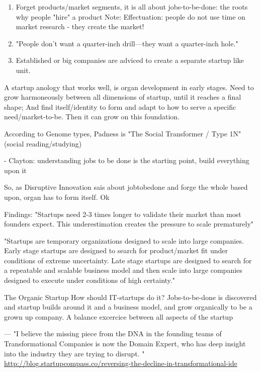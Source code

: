 \documentclass[a4paper,10pt]{book}
\begin{document}
\begin{enumerate}
 \item Forget products/market segments, it is all about jobs-to-be-done: the roots why people "hire" a product \cite{reinvetingBusinessModel}
       Note: Effectuation: people do not use time on market research - they create the market!
 \item "People don’t want a quarter-inch drill—they want a quarter-inch hole."
 \item Established or big companies are adviced to create a separate startup like unit.
\end{enumerate}

 
 
A startup anology that works well, is organ development in early stages. 
Need to grow harmoneously between all dimensions of startup, until it reaches a final shape;
And find itself/identity to form and adapt to how to serve a specific need/market-to-be.
Then it can grow on this foundation.

According to Genome types, Padness is "The Social Transformer / Type 1N" (social reading/studying)

 - Clayton: understanding jobs to be done is the starting point, build everything upon it \cite{reinvetingBusinessModel}

So, as Disruptive Innovation sais about jobtobedone and forge the whole based upon, organ has to form itself. Ok

Findings:
"Startups need 2-3 times longer to validate their market than most founders
expect. This underestimation creates the pressure to scale prematurely"

"Startups are temporary organizations designed to scale into large companies.
Early stage startups are designed to search for product/market fit under
conditions of extreme uncertainty. Late stage startups are designed to search for
a repeatable and scalable business model and then scale into large companies
designed to execute under conditions of high certainty."

The Organic Startup
 How should IT-startups do it? Jobs-to-be-done is discovered and startup builds around it and a business model, and grow organically
 to be a grown up company.
 A balance excercice between all aspects of the startup
 
 
 ---
 "I believe the missing piece from the DNA in the founding teams of 
  Transformational Companies is now the Domain Expert, 
  who has deep insight into the industry they are trying to disrupt. "
 \url{http://blog.startupcompass.co/reversing-the-decline-in-transformational-ide}\\
\end{document}
